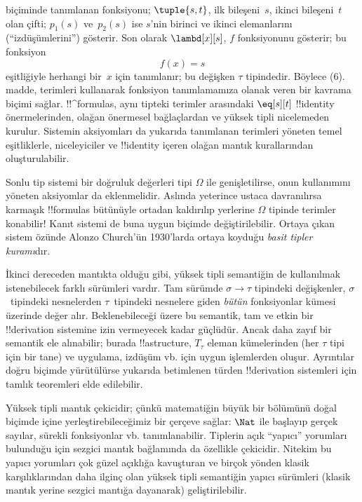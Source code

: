 biçiminde tanımlanan fonksiyonu; $\tuple{s, t}$, ilk bileşeni~$s$, ikinci
bileşeni~$t$ olan çifti; $p_1(s)$ ve~$p_2(s)$ ise $s$'nin birinci ve ikinci
elemanlarını (``izdüşümlerini'') gösterir. Son olarak $\lambd[x][s]$, $f$
fonksiyonunu gösterir; bu fonksiyon
\[
f(x) = s
\]
eşitliğiyle herhangi bir~$x$ için tanımlanır; bu değişken $\tau$ tipindedir.
Böylece (6).
madde, terimleri
kullanarak fonksiyon tanımlamamıza olanak veren bir kavrama biçimi sağlar.
!!^{formula}s, aynı tipteki terimler arasındaki $\eq[s][t]$ !!{identity}
önermelerinden, olağan önermesel bağlaçlardan ve yüksek tipli nicelemeden
kurulur. Sistemin aksiyomları da yukarıda tanımlanan terimleri yöneten temel
eşitliklerle, niceleyiciler ve !!{identity} içeren olağan mantık kurallarından
oluşturulabilir.

Sonlu tip sistemi bir doğruluk değerleri tipi $\Omega$ ile genişletilirse,
onun kullanımını yöneten aksiyomlar da eklenmelidir. Aslında yeterince ustaca
davranılırsa karmaşık !!{formula}s bütünüyle ortadan kaldırılıp yerlerine
$\Omega$ tipinde terimler konabilir!{} Kanıt sistemi de buna uygun biçimde
değiştirilebilir. Ortaya çıkan sistem özünde Alonzo Church'ün 1930'larda ortaya
koyduğu \emph{basit tipler kuramı}dır.

İkinci dereceden mantıkta olduğu gibi, yüksek tipli semantiğin de kullanılmak
istenebilecek farklı sürümleri vardır. Tam sürümde $\sigma \to \tau$ tipindeki
değişkenler, $\sigma$~tipindeki nesnelerden $\tau$~tipindeki nesnelere giden
\emph{bütün} fonksiyonlar kümesi üzerinde değer alır. Beklenebileceği üzere bu
semantik, tam ve etkin bir !!{derivation} sistemine izin vermeyecek kadar
güçlüdür. Ancak daha zayıf bir semantik ele alınabilir; burada !!a{structure},
$T_\tau$ eleman kümelerinden (her $\tau$ tipi için bir tane) ve uygulama,
izdüşüm vb. için uygun işlemlerden oluşur. Ayrıntılar doğru biçimde yürütülürse
yukarıda
betimlenen türden !!{derivation} sistemleri için tamlık teoremleri elde
edilebilir.

Yüksek tipli mantık çekicidir; çünkü matematiğin büyük bir bölümünü doğal
biçimde içine yerleştirebileceğimiz bir çerçeve sağlar: $\Nat$ ile başlayıp
gerçek sayılar, sürekli fonksiyonlar vb. tanımlanabilir. Tiplerin açık
``yapıcı'' yorumları bulunduğu için sezgici mantık bağlamında da özellikle
çekicidir. Nitekim bu yapıcı yorumları çok güzel açıklığa kavuşturan ve birçok
yönden klasik karşılıklarından daha ilginç olan yüksek tipli semantiğin yapıcı
sürümleri (klasik mantık yerine sezgici mantığa dayanarak) geliştirilebilir.

